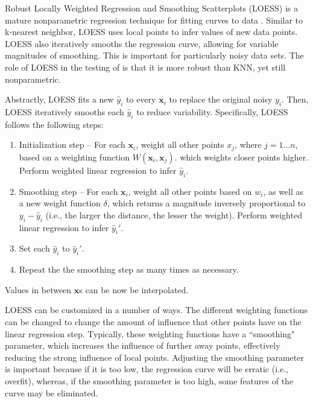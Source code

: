 Robust Locally Weighted Regression and Smoothing Scatterplots (LOESS) is a mature nonparametric regression technique for fitting curves to data   \cite{cleveland1979robust,cleveland1988locally}.
Similar to k-nearest neighbor, LOESS uses local points to infer values of new data points.
LOESS also iteratively smooths the regression curve, allowing for variable magnitudes of smoothing.
This is important for particularly noisy data sets.
The role of LOESS in the testing of \fw is that it is more robust than KNN, yet still nonparametric.

Abstractly, LOESS fits a new $\hat y_i$ to every $\mathbf x_i$ to replace the original noisy $y_i$.
Then, LOESS iteratively smooths each $\hat y_i$ to reduce variability.
Specifically, LOESS follows the following steps:
\begin{enumerate}
   \item Initialization step -- For each $\mathbf x_i$, weight all other points $x_j$, where $j = 1...n$, based on a weighting function $W(\mathbf x_i, \mathbf x_j)$. which weights closer points higher. Perform weighted linear regression to infer $\hat y_i$.
   \item Smoothing step -- For each $\mathbf x_i$, weight all other points based on $w_i$, as well as a new weight function $\delta$, which returns a magnitude inversely proportional to $y_i - \hat y_i$ (i.e., the larger the distance, the lesser the weight). Perform weighted linear regression to infer $\hat y_i'$.
   \item Set each $\hat y_i$ to $\hat y_i'$.
   \item Repeat the the smoothing step as many times as necessary.
\end{enumerate}
Values in between $\mathbf x$s can be now be interpolated.

LOESS can be customized in a number of ways.
The different weighting functions can be changed to change the amount of influence that other points have on the linear regression step.
Typically, these weighting functions have a ``smoothing" parameter, which increases the influence of further away points, effectively reducing the strong influence of local points.
Adjusting the smoothing parameter is important because if it is too low, the regression curve will be erratic (i.e., overfit), whereas, if the smoothing parameter is too high, some features of the curve may be eliminated.

